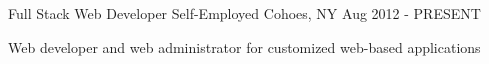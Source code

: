 \begin{cventries}
  \cventry
    {Full Stack Web Developer} %
    {Self-Employed} %
    {Cohoes, NY} %
    {Aug 2012 - PRESENT} %
    {
      \begin{cvitems} %
        \item {Web developer and web administrator for customized web-based applications}
      \end{cvitems}
    }

\end{cventries}
